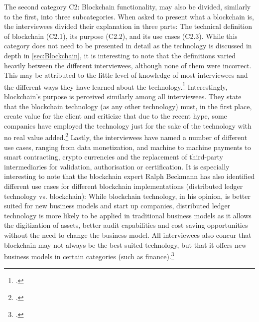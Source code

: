 The second category C2: Blockchain functionality, may also be divided, similarly to the first, into three subcategories. When asked to present what a blockchain is, the interviewees divided their explanation in three parts: The technical definition of blockchain (C2.1), its purpose (C2.2), and its use cases (C2.3). While this category does not need to be presented in detail as the technology is discussed in depth in \ref{sec:Blockchain}, it is interesting to note that the definitions varied heavily between the different interviewees, although none of them were incorrect. This may be attributed to the little level of knowledge of most interviewees and the different ways they have learned about the technology.\footcites[Cf.][P3]{DanielKaltenbach_Interview}[cf.][P58]{BjoernPaulewicz_Interview}[cf.][P91]{RalphBeckmann_Interview} Interestingly, blockchain's purpose is perceived similarly among all interviewees. They state that the blockchain technology (as any other technology) must, in the first place, create value for the client and criticize that due to the recent hype, some companies have employed the technology just for the sake of the technology with no real value added.\footcites[Cf.][P23, P25, P26, P27]{DanielKaltenbach_Interview}[cf.][P69]{BjoernPaulewicz_Interview}[cf.][P92, P114, P117]{RalphBeckmann_Interview} Lastly, the interviewees have named a number of different use cases, ranging from data monetization, and machine to machine payments to smart contracting, crypto currencies and the replacement of third-party intermediaries for validation, authorisation or certification. It is especially interesting to note that the blockchain expert Ralph Beckmann has also identified different use cases for different blockchain implementations (distributed ledger technology vs. blockchain): While blockchain technology, in his opinion, is better suited for new business models and start up companies, distributed ledger technology is more likely to be applied in traditional business models as it allows the digitization of assets, better audit capabilities and cost saving opportunities without the need to change the business model. All interviewees also concur that blockchain may not always be the best suited technology, but that it offers new business models in certain categories (such as finance).\footcites[Cf.][P14, P17]{DanielKaltenbach_Interview}[cf.][P57, P80, P77]{BjoernPaulewicz_Interview}[cf.][P103, P194, P105, P106, P107]{RalphBeckmann_Interview}

